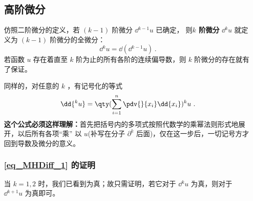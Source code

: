 \subsection{高阶微分}
仿照二阶微分的定义，若 $(k-1)$ 阶微分 $\dd{^{k-1}}u$ 已确定， 则\textbf{$k$ 阶微分} $\dd{^ku}$ 就定义为 $(k-1)$ 阶微分的全微分：
\begin{equation}
\dd{^k u}=\dd{(\dd{^{k-1}}u)}~.
\end{equation}
若函数 $u$ 存在着直至 $k$ 阶为止的所有各阶的连续偏导数，则 $k$ 阶微分的存在就有了保证。

 同样的，对任意的 $k$ ，有记号化的等式
 \begin{equation}\label{eq_MHDiff_1}
 \dd{^ku}=\qty(\sum_{i=1}^n\pdv{}{x_i}\dd{x_i})^k u~.
 \end{equation}
 \textbf{这个公式必须这样理解：}首先把括号内的多项式按照代数学的乘幂法则形式地展开，以后所有各项“乘” 以 $u$(补写在分子 $\partial^k$ 后面)，仅在这一步后，一切记号方才回到导数及微分的意义。
 \subsubsection{\autoref{eq_MHDiff_1} 的证明}
 当 $k=1,2$ 时，我们已看到为真；故只需证明，若它对于 $\dd{^k u}$ 为真，则对于 $\dd{^{k+1}u}$ 为真即可。
 
